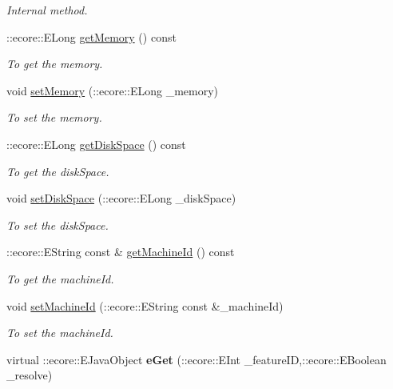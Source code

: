 \begin{DoxyCompactItemize}
\begin{DoxyCompactList}\small\item\em Internal method. \item\end{DoxyCompactList}\item 
::ecore::ELong \hyperlink{classIMS__Data_1_1SystemInfo_ab441e148efc4a6ce768e0ab96104d9eb}{getMemory} () const 
\begin{DoxyCompactList}\small\item\em To get the memory. \item\end{DoxyCompactList}\item 
void \hyperlink{classIMS__Data_1_1SystemInfo_ae87c6f9786f04400f4914f56b539698a}{setMemory} (::ecore::ELong \_\-memory)
\begin{DoxyCompactList}\small\item\em To set the memory. \item\end{DoxyCompactList}\item 
::ecore::ELong \hyperlink{classIMS__Data_1_1SystemInfo_a7134a8a9a280e10789bfb79dac604a53}{getDiskSpace} () const 
\begin{DoxyCompactList}\small\item\em To get the diskSpace. \item\end{DoxyCompactList}\item 
void \hyperlink{classIMS__Data_1_1SystemInfo_a6d76c79c19e8067de99da50a78825a8f}{setDiskSpace} (::ecore::ELong \_\-diskSpace)
\begin{DoxyCompactList}\small\item\em To set the diskSpace. \item\end{DoxyCompactList}\item 
::ecore::EString const \& \hyperlink{classIMS__Data_1_1SystemInfo_a27321fbd8ac894285f2c2444326e298b}{getMachineId} () const 
\begin{DoxyCompactList}\small\item\em To get the machineId. \item\end{DoxyCompactList}\item 
void \hyperlink{classIMS__Data_1_1SystemInfo_a6efb74450231902c97cc5581b98850bd}{setMachineId} (::ecore::EString const \&\_\-machineId)
\begin{DoxyCompactList}\small\item\em To set the machineId. \item\end{DoxyCompactList}\item 
\hypertarget{classIMS__Data_1_1SystemInfo_afa6c7450d1f9c4b44f73538075e05cc9}{
virtual ::ecore::EJavaObject {\bfseries eGet} (::ecore::EInt \_\-featureID,::ecore::EBoolean \_\-resolve)}
\label{classIMS__Data_1_1SystemInfo_afa6c7450d1f9c4b44f73538075e05cc9}


\end{DoxyCompactItemize}
